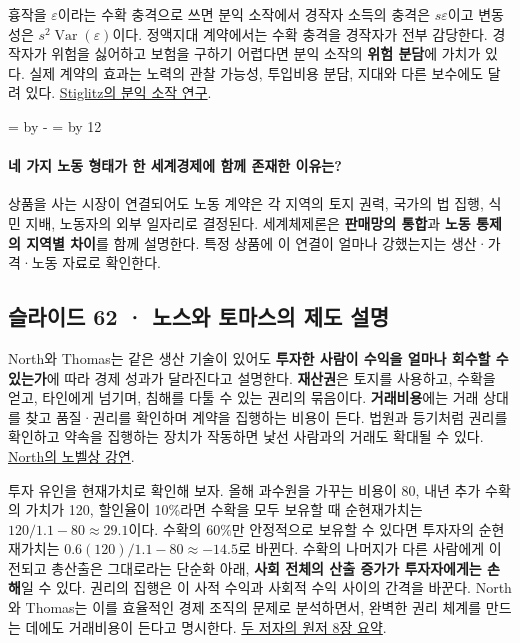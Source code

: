 \documentclass[10pt,a4paper]{article}
\newcommand{\ReserveQuestionSpace}{%
  \par\begingroup
  \dimen0=\pagegoal \advance\dimen0 by -\pagetotal
  \dimen2=\baselineskip \multiply\dimen2 by 12
  \ifdim\dimen0<\dimen2 \newpage\fi
  \endgroup}
\begin{document}
흉작을 $\varepsilon$이라는 수확 충격으로 쓰면 분익 소작에서 경작자 소득의 충격은 $s\varepsilon$이고 변동성은 $s^2\operatorname{Var}(\varepsilon)$이다. 정액지대 계약에서는 수확 충격을 경작자가 전부 감당한다. 경작자가 위험을 싫어하고 보험을 구하기 어렵다면 분익 소작의 \textbf{위험 분담}에 가치가 있다. 실제 계약의 효과는 노력의 관찰 가능성, 투입비용 분담, 지대와 다른 보수에도 달려 있다. \href{https://cowles.yale.edu/sites/default/files/files/pub/d03/d0353.pdf}{Stiglitz의 분익 소작 연구}.\par

\ReserveQuestionSpace
\paragraph{네 가지 노동 형태가 한 세계경제에 함께 존재한 이유는?}
상품을 사는 시장이 연결되어도 노동 계약은 각 지역의 토지 권력, 국가의 법 집행, 식민 지배, 노동자의 외부 일자리로 결정된다. 세계체제론은 \textbf{판매망의 통합}과 \textbf{노동 통제의 지역별 차이}를 함께 설명한다. 특정 상품에 이 연결이 얼마나 강했는지는 생산·가격·노동 자료로 확인한다.\par

\subsection{슬라이드 62 · 노스와 토마스의 제도 설명}
North와 Thomas는 같은 생산 기술이 있어도 \textbf{투자한 사람이 수익을 얼마나 회수할 수 있는가}에 따라 경제 성과가 달라진다고 설명한다. \textbf{재산권}은 토지를 사용하고, 수확을 얻고, 타인에게 넘기며, 침해를 다툴 수 있는 권리의 묶음이다. \textbf{거래비용}에는 거래 상대를 찾고 품질·권리를 확인하며 계약을 집행하는 비용이 든다. 법원과 등기처럼 권리를 확인하고 약속을 집행하는 장치가 작동하면 낯선 사람과의 거래도 확대될 수 있다. \href{https://www.nobelprize.org/prizes/economic-sciences/1993/north/lecture/}{North의 노벨상 강연}.\par

투자 유인을 현재가치로 확인해 보자. 올해 과수원을 가꾸는 비용이 80, 내년 추가 수확의 가치가 120, 할인율이 10\%라면 수확을 모두 보유할 때 순현재가치는 $120/1.1-80\approx29.1$이다. 수확의 60\%만 안정적으로 보유할 수 있다면 투자자의 순현재가치는 $0.6(120)/1.1-80\approx-14.5$로 바뀐다. 수확의 나머지가 다른 사람에게 이전되고 총산출은 그대로라는 단순화 아래, \textbf{사회 전체의 산출 증가가 투자자에게는 손해}일 수 있다. 권리의 집행은 이 사적 수익과 사회적 수익 사이의 간격을 바꾼다. North와 Thomas는 이를 효율적인 경제 조직의 문제로 분석하면서, 완벽한 권리 체계를 만드는 데에도 거래비용이 든다고 명시한다. \href{https://www.cambridge.org/core/books/rise-of-the-western-world/5F1DE6B987979B86D94DCA2C1C4FFE31/listing}{두 저자의 원저 8장 요약}.\par
\end{document}
